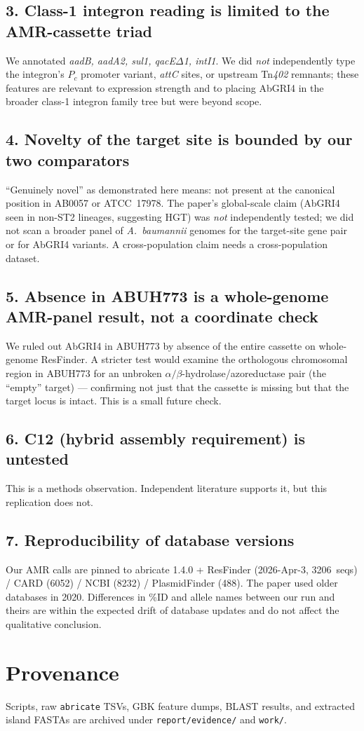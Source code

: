 \documentclass[11pt]{article}
\begin{document}
\subsection*{3. Class-1 integron reading is limited to the AMR-cassette triad}
We annotated \textit{aadB, aadA2, sul1, qacE$\Delta$1, intI1}. We did \emph{not} independently type the integron's $P_c$ promoter variant, \textit{attC} sites, or upstream Tn\textit{402} remnants; these features are relevant to expression strength and to placing AbGRI4 in the broader class-1 integron family tree but were beyond scope.

\subsection*{4. Novelty of the target site is bounded by our two comparators}
``Genuinely novel'' as demonstrated here means: not present at the canonical position in AB0057 or ATCC~17978. The paper's global-scale claim (AbGRI4 seen in non-ST2 lineages, suggesting HGT) was \emph{not} independently tested; we did not scan a broader panel of \textit{A.\ baumannii} genomes for the target-site gene pair or for AbGRI4 variants. A cross-population claim needs a cross-population dataset.

\subsection*{5. Absence in ABUH773 is a whole-genome AMR-panel result, not a coordinate check}
We ruled out AbGRI4 in ABUH773 by absence of the entire cassette on whole-genome ResFinder. A stricter test would examine the orthologous chromosomal region in ABUH773 for an unbroken $\alpha/\beta$-hydrolase/azoreductase pair (the ``empty'' target) --- confirming not just that the cassette is missing but that the target locus is intact. This is a small future check.

\subsection*{6. C12 (hybrid assembly requirement) is untested}
This is a methods observation. Independent literature supports it, but this replication does not.

\subsection*{7. Reproducibility of database versions}
Our AMR calls are pinned to abricate 1.4.0 + ResFinder (2026-Apr-3, 3206~seqs) / CARD (6052) / NCBI (8232) / PlasmidFinder (488). The paper used older databases in 2020. Differences in \%ID and allele names between our run and theirs are within the expected drift of database updates and do not affect the qualitative conclusion.

\section*{Provenance}
Scripts, raw \texttt{abricate} TSVs, GBK feature dumps, BLAST results, and extracted island FASTAs are archived under \texttt{report/evidence/} and \texttt{work/}.
\end{document}
